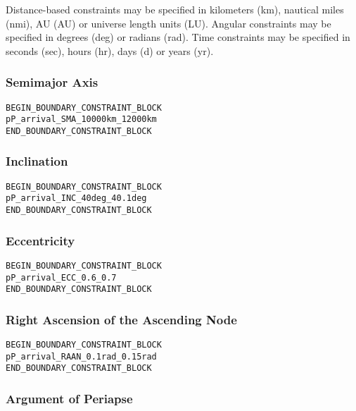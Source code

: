 \documentclass[11pt]{article}
\begin{document}
Distance-based constraints may be specified in kilometers (km), nautical miles (nmi), \ac{AU} (AU) or universe length units (LU). Angular constraints may be specified in degrees (deg) or radians (rad). Time constraints may be specified in seconds (sec), hours (hr), days (d) or years (yr).

\subsubsection{Semimajor Axis}
\label{sec:boundarySMAconstraint}

\begin{verbatim}
BEGIN_BOUNDARY_CONSTRAINT_BLOCK
pP_arrival_SMA_10000km_12000km
END_BOUNDARY_CONSTRAINT_BLOCK
\end{verbatim}

\subsubsection{Inclination}
\label{sec:boundaryINCconstraint}
\begin{verbatim}
BEGIN_BOUNDARY_CONSTRAINT_BLOCK
pP_arrival_INC_40deg_40.1deg
END_BOUNDARY_CONSTRAINT_BLOCK
\end{verbatim}

\subsubsection{Eccentricity}
\label{sec:boundaryECCconstraint}

\begin{verbatim}
BEGIN_BOUNDARY_CONSTRAINT_BLOCK
pP_arrival_ECC_0.6_0.7
END_BOUNDARY_CONSTRAINT_BLOCK
\end{verbatim}

\subsubsection{Right Ascension of the Ascending Node}
\label{sec:boundaryRAANconstraint}

\begin{verbatim}
BEGIN_BOUNDARY_CONSTRAINT_BLOCK
pP_arrival_RAAN_0.1rad_0.15rad
END_BOUNDARY_CONSTRAINT_BLOCK
\end{verbatim}

\subsubsection{Argument of Periapse}
\label{sec:boundaryAOPconstraint}
\end{document}
